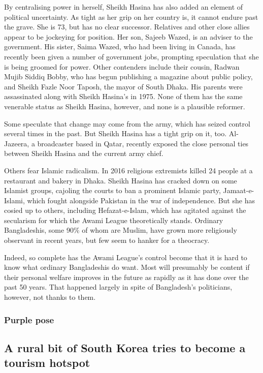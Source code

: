 \documentclass{article}
\begin{document}
By centralising power in herself, Sheikh Hasina has also added an element of political uncertainty. As tight as her grip on her country is, it cannot endure past the grave. She is 73, but has no clear successor. Relatives and other close allies appear to be jockeying for position. Her son, Sajeeb Wazed, is an adviser to the government. His sister, Saima Wazed, who had been living in Canada, has recently been given a number of government jobs, prompting speculation that she is being groomed for power. Other contenders include their cousin, Radwan Mujib Siddiq Bobby, who has begun publishing a magazine about public policy, and Sheikh Fazle Noor Taposh, the mayor of South Dhaka. His parents were assassinated along with Sheikh Hasina's in 1975. None of them has the same venerable status as Sheikh Hasina, however, and none is a plausible reformer. 

Some speculate that change may come from the army, which has seized control several times in the past. But Sheikh Hasina has a tight grip on it, too. Al-Jazeera, a broadcaster based in Qatar, recently exposed the close personal ties between Sheikh Hasina and the current army chief. 

Others fear Islamic radicalism. In 2016 religious extremists killed 24 people at a restaurant and bakery in Dhaka. Sheikh Hasina has cracked down on some Islamist groups, cajoling the courts to ban a prominent Islamic party, Jamaat-e-Islami, which fought alongside Pakistan in the war of independence. But she has cosied up to others, including Hefazat-e-Islam, which has agitated against the secularism for which the Awami League theoretically stands. Ordinary Bangladeshis, some 90\% of whom are Muslim, have grown more religiously observant in recent years, but few seem to hanker for a theocracy. 

Indeed, so complete has the Awami League's control become that it is hard to know what ordinary Bangladeshis do want. Most will presumably be content if their personal welfare improves in the future as rapidly as it has done over the past 50 years. That happened largely in spite of Bangladesh's politicians, however, not thanks to them. {} 
\clearpage
\subsubsection{Purple pose }
\subsection{A rural bit of South Korea tries to become a tourism hotspot }
\end{document}
